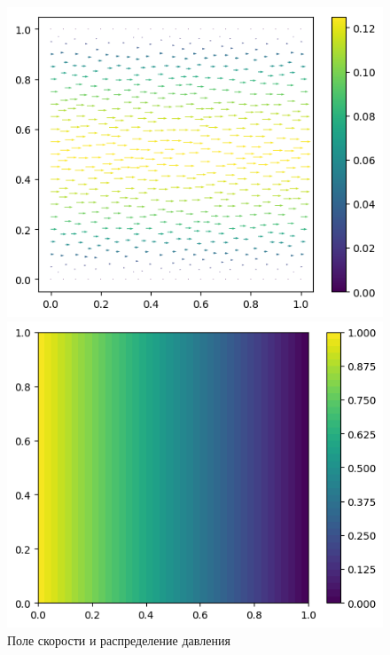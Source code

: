 \documentclass[a4paper,10pt]{report}
\begin{document}
\begin{figure}[H]
    \begin{minipage}{0.49\linewidth}
        \includegraphics[height=0.75\linewidth]{poiseuilleflow/u.png}
    \end{minipage}
    \begin{minipage}{0.49\linewidth}
        \includegraphics[height=0.75\linewidth]{poiseuilleflow/p.png}
    \end{minipage}
    \label{fig:poiseuilleflow}
    \caption{Поле скорости и распределение давления}
\end{figure}
    
\end{document}
